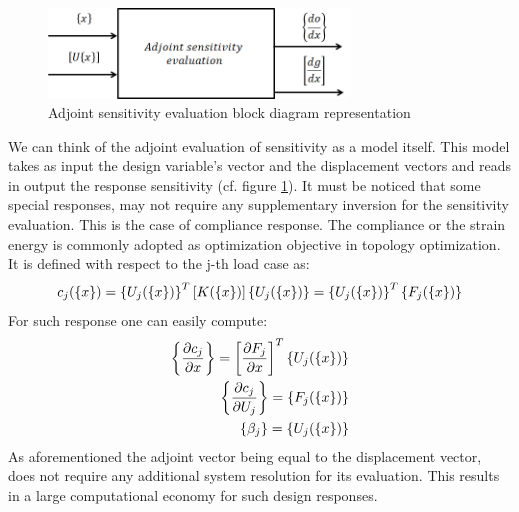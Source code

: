    \begin{figure}[ht]
   \centering
   \includegraphics[width=8cm]{images/Ch2/Adjoint}
   \caption{Adjoint sensitivity evaluation block diagram representation}
   \label{fig.2.6}
   \end{figure}
    We can think of the adjoint evaluation of sensitivity as a model itself. This model takes as input the design variable's vector and the displacement vectors and reads in output the response sensitivity (cf. figure \ref{fig.2.6}).
    It must be noticed that some special responses, may not require any supplementary inversion for the sensitivity evaluation. This is the case of compliance response. The compliance or the strain energy is commonly adopted as optimization objective in topology optimization. It is defined with respect to the j-th load case as:
    \begin{equation}
    c_j(\left\lbrace{x}\right \rbrace)=\left\lbrace{ U_j (\ensuremath\left\lbrace{x}\right \rbrace)}\right \rbrace^T \left[{K(\left\lbrace{x}\right \rbrace)}\right]\left\lbrace{ U_j (\ensuremath\left\lbrace{x}\right \rbrace)}\right \rbrace=\left\lbrace{ U_j (\ensuremath\left\lbrace{x}\right \rbrace)}\right \rbrace^T\left\lbrace{ F_j (\ensuremath\left\lbrace{x}\right \rbrace)}\right \rbrace
    \end{equation}
   For such response one can easily compute:
   \begin{eqnarray}
   \left\lbrace{\frac{\partial c_j}{\partial x}}\right \rbrace=\left[{ \frac{\partial F_j}{\partial x}}\right]^T\left\lbrace{ U_j (\ensuremath\left\lbrace{x}\right \rbrace)}\right \rbrace\\
    \left\lbrace{\frac{\partial c_j}{\partial U_j}}\right \rbrace=\left\lbrace{ F_j (\ensuremath\left\lbrace{x}\right \rbrace)}\right \rbrace\\
    \left\lbrace{\beta_j}\right \rbrace=\left\lbrace{ U_j (\ensuremath\left\lbrace{x}\right \rbrace)}\right \rbrace
   \end{eqnarray}
   As aforementioned the adjoint vector being equal to the displacement vector, does not require any additional system resolution for its evaluation. This results in a large computational economy for such design responses.
